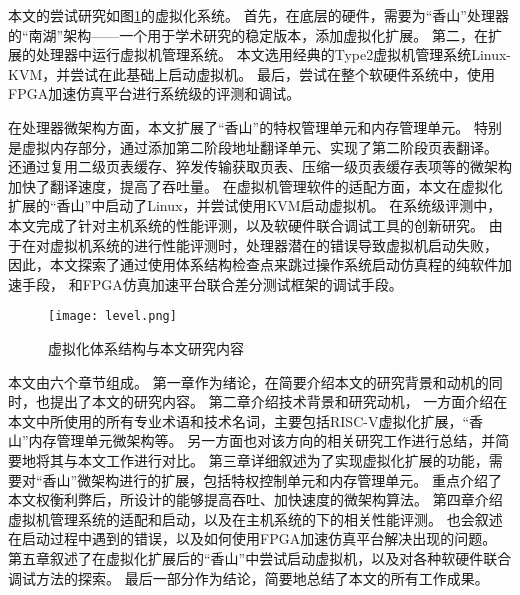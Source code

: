 本文的尝试研究如图\ref{fig:level}的虚拟化系统。
首先，在底层的硬件，需要为“香山”处理器的“南湖”架构——一个用于学术研究的稳定版本，添加虚拟化扩展。
第二，在扩展的处理器中运行虚拟机管理系统。
本文选用经典的Type2虚拟机管理系统Linux-KVM\cite{kvm:H-ext}，并尝试在此基础上启动虚拟机。
最后，尝试在整个软硬件系统中，使用FPGA加速仿真平台进行系统级的评测和调试。

在处理器微架构方面，本文扩展了“香山”的特权管理单元和内存管理单元。
特别是虚拟内存部分，通过添加第二阶段地址翻译单元、实现了第二阶段页表翻译。
还通过复用二级页表缓存、猝发传输获取页表、压缩一级页表缓存表项等的微架构加快了翻译速度，提高了吞吐量。
在虚拟机管理软件的适配方面，本文在虚拟化扩展的“香山”中启动了Linux，并尝试使用KVM启动虚拟机。
在系统级评测中，本文完成了针对主机系统的性能评测，以及软硬件联合调试工具的创新研究。
由于在对虚拟机系统的进行性能评测时，处理器潜在的错误导致虚拟机启动失败，
因此，本文探索了通过使用体系结构检查点来跳过操作系统启动仿真程的纯软件加速手段，
和FPGA仿真加速平台联合差分测试框架的调试手段。

\begin{figure}[htbp]
    \centering
    \texttt{[image: level.png]}
\caption{虚拟化体系结构与本文研究内容}
    \label{fig:level}
\end{figure}


本文由六个章节组成。
第一章作为绪论，在简要介绍本文的研究背景和动机的同时，也提出了本文的研究内容。
第二章介绍技术背景和研究动机，
一方面介绍在本文中所使用的所有专业术语和技术名词，主要包括RISC-V虚拟化扩展，“香山”内存管理单元微架构等。
另一方面也对该方向的相关研究工作进行总结，并简要地将其与本文工作进行对比。
第三章详细叙述为了实现虚拟化扩展的功能，需要对“香山”微架构进行的扩展，包括特权控制单元和内存管理单元。
重点介绍了本文权衡利弊后，所设计的能够提高吞吐、加快速度的微架构算法。
第四章介绍虚拟机管理系统的适配和启动，以及在主机系统的下的相关性能评测。
也会叙述在启动过程中遇到的错误，以及如何使用FPGA加速仿真平台解决出现的问题。
第五章叙述了在虚拟化扩展后的“香山”中尝试启动虚拟机，以及对各种软硬件联合调试方法的探索。
最后一部分作为结论，简要地总结了本文的所有工作成果。